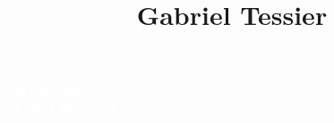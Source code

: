 \documentclass[11pt,oneside,a4paper,titlepage]{article}
\title{Gabriel Tessier}
\date{}
\begin{document}
\begin{tcolorbox}
  \begin{minipage}{4.5cm}
  \end{minipage}
  \begin{minipage}{15cm}
    \begin{center}
      \Huge{\textcolor{white}{Gabriel TESSIER}}\\
      \vspace*{0.5cm}
      \Large{\textcolor{white}{\emph{Étudiant Ensimag $2^{e}$ année}}}
    \end{center}
  \end{minipage}
\end{tcolorbox}
\end{document}
